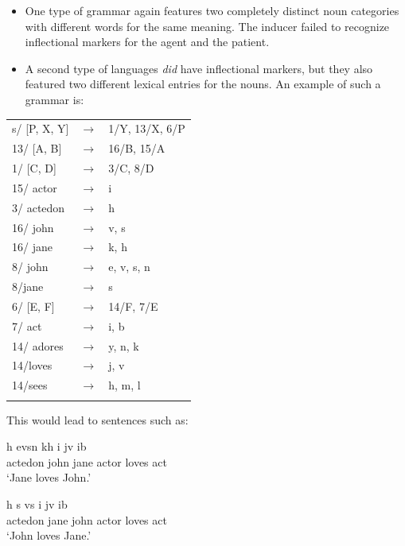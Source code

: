 \begin{itemize}
\item One type of grammar again features two completely distinct noun categories with different words for the same meaning. The inducer failed to recognize inflectional markers for the agent and the patient.
\item A second type of languages {\em did} have inflectional markers, but they also featured two different lexical entries for the nouns. An example of such a grammar is:
\end{itemize}

\ea
\label{g:moy-grammar2}
\begin{tabular}{l c l}
s/ [P, X, Y] & $\rightarrow$  & 1/Y, 13/X, 6/P
\\ 13/ [A, B] & $\rightarrow$  & 16/B, 15/A
\\ 1/ [C, D] & $\rightarrow$  & 3/C, 8/D
\\ 15/ actor & $\rightarrow$  & i
\\ 3/ actedon & $\rightarrow$  & h
\\ 16/ john & $\rightarrow$  & v, s
\\ 16/ jane & $\rightarrow$  &  k, h
\\ 8/ john & $\rightarrow$  & e, v, s, n
\\ 8/jane & $\rightarrow$  & s
\\ 6/ [E, F] & $\rightarrow$  & 14/F, 7/E
\\ 7/ act & $\rightarrow$  & i, b
\\ 14/ adores & $\rightarrow$  & y, n, k
\\ 14/loves & $\rightarrow$  & j, v
\\ 14/sees & $\rightarrow$  & h, m, l
\\ \citep[230]{moy06case}
\end{tabular}
\z

This would lead to sentences such as: 

\ea
\gll h evsn kh i jv ib \\
actedon john jane actor loves act \\
\glt `Jane loves John.' \\

\item
\gll h s vs i jv ib \\
actedon jane john actor loves act \\
\glt `John loves Jane.' \\
\z

